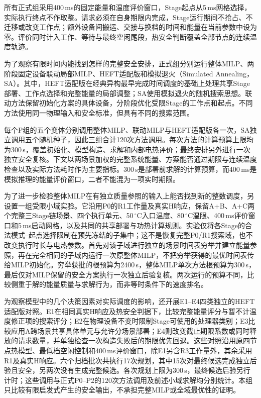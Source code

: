 所有正式组采用400\,ms的固定能量和温度评价窗口，Stage起点从5\,ms网格选择，实际执行终点不作取整。请求必须在自身期限内完成，Stage运行期间不抢占、不迁移或改变工作点；额外设备间搬运、交接与换档的时间和能量在当前参数中设为零。评价同时计入工作、等待与最终空闲尾段，热安全判断覆盖全部节点的连续温度轨迹。

为了观察有限时间内能找到怎样的完整安全安排，正式组分别运行整体MILP、两阶段固定设备联动局部MILP、HEFT适配版和模拟退火（Simulated Annealing，SA）。其中，HEFT适配版在经典异构最早完成时间调度\cite{topcuoglu2002heft}的基础上处理共享Stage部署、工作点选择和完整能量的局部调整；SA使用模拟退火的随机搜索思想\cite{kirkpatrick1983sa}。联动方法保留初始化方案的具体设备，分阶段优化受限Stage的工作点和起点。不同方法使用同一物理输入和安全标准，但具有不同的搜索范围。

每个P组的五个变体分别调用整体MILP、联动MILP与HEFT适配版各一次，SA独立调用五个随机种子，因此三组合计120次方法调用。每次方法的计算预算上限均为300\,s，覆盖初始化、模型构造、求解和内部电热评价；最终安排另外进行一次独立安全复核。下文以两场景加权的完整系统能量、方案能否通过期限与连续温度检查以及实际方法耗时作为主要指标。300\,s是部署前求解的计算预算，而400\,ms是模拟推理的能量评价窗口，二者不能混为一项实时期限。

为了进一步检验整体MILP在有独立质量参照的输入上能否找到新的整数调度，另设置一组受限小域实验。它沿用P0的R1工作量及真实H响应，保留A+B、A+C两个完整三Stage链场景、四个执行单元、50\,$^\circ$C入口温度、80\,$^\circ$C温限、400\,ms评价窗口和5\,ms启动网格，以及共同的共享部署与功热计算规则。实验仅将各Stage的合法模式--起点选择限制在预先冻结的子集中；这不是恢复完整P0/R1搜索域，也不改变执行时长与电热参数。首先对该子域进行独立的场景时间表穷举并建立能量参照，再在完全相同的子域内运行一次原整体MILP，不把穷举获得的最优时间表传给MILP初始化。穷举获批的根预算为2400\,s，整体MILP单次方法根预算为300\,s，最后仅对MILP保留的安全方案执行一次独立后验复核。两次运行的预算不同，比较侧重于解的能量质量与求解行为，而非等时条件下的速度排名。

为观察模型中的几个决策因素对实际调度的影响，还开展E1--E4四类独立的HEFT适配版对照。E1在相同真实H响应及热安全判据下，比较完整能量评分与暂不计温度修正项的搜索评分；E2在物理设备不变时限制Stage可使用的处理器类别；E3比较应用A跨场景共享具体单元与允许分场景部署；E4则改变截止期限系数或同时释放的请求数量，并单独检查一次构造失败后的期限优先回退。这些对照沿用原四节点热模型、最低档空闲控制和400\,ms评价窗口，除E1另含R3工作量外，其余采用R1及真实H响应。六个归档批次共执行17次规划，其中15次对最终候选完成独立后验且安全，另两次没有生成完整候选。各次规划上限为300\,s，最终候选后验另行计时；这些调用与正式P0--P2的120次方法调用及前述小域求解均分别统计。本组只比较有限启发式产生的安全输出，不承担完整MILP或全域最优性的证明。

